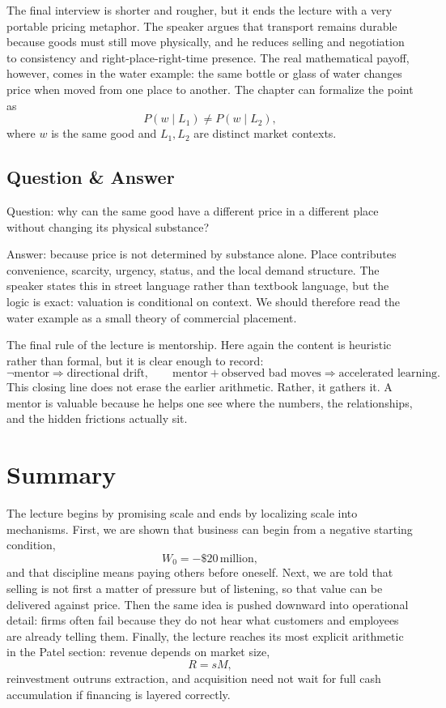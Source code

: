 The final interview is shorter and rougher, but it ends the lecture with a very portable pricing metaphor. The speaker argues that transport remains durable because goods must still move physically, and he reduces selling and negotiation to consistency and right-place-right-time presence. The real mathematical payoff, however, comes in the water example: the same bottle or glass of water changes price when moved from one place to another. The chapter can formalize the point as
\begin{equation}
P(w\mid L_1) \ne P(w\mid L_2),
\end{equation}
where \(w\) is the same good and \(L_1,L_2\) are distinct market contexts.

\subsection{Question \& Answer}

Question: why can the same good have a different price in a different place without changing its physical substance?

Answer: because price is not determined by substance alone. Place contributes convenience, scarcity, urgency, status, and the local demand structure. The speaker states this in street language rather than textbook language, but the logic is exact: valuation is conditional on context. We should therefore read the water example as a small theory of commercial placement.

The final rule of the lecture is mentorship. Here again the content is heuristic rather than formal, but it is clear enough to record:
\begin{equation}
\neg \text{mentor} \Rightarrow \text{directional drift}, \qquad
\text{mentor} + \text{observed bad moves} \Rightarrow \text{accelerated learning}.
\end{equation}
This closing line does not erase the earlier arithmetic. Rather, it gathers it. A mentor is valuable because he helps one see where the numbers, the relationships, and the hidden frictions actually sit.

\section{Summary}

The lecture begins by promising scale and ends by localizing scale into mechanisms. First, we are shown that business can begin from a negative starting condition,
\[
W_0=-\$20\,\text{million},
\]
and that discipline means paying others before oneself. Next, we are told that selling is not first a matter of pressure but of listening, so that value can be delivered against price. Then the same idea is pushed downward into operational detail: firms often fail because they do not hear what customers and employees are already telling them. Finally, the lecture reaches its most explicit arithmetic in the Patel section: revenue depends on market size,
\[
R=sM,
\]
reinvestment outruns extraction, and acquisition need not wait for full cash accumulation if financing is layered correctly.

